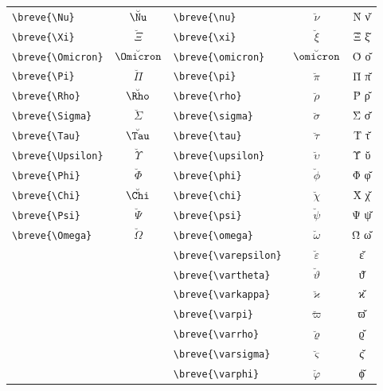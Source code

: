 \documentclass[12pt,a4paper]{article}
\begin{document}
\begin{longtable}{|l|c|l|c|c|}
\verb|\breve{\Nu}|         & $\breve{\Nu}$      & \verb|\breve{\nu}|         & $\breve{\nu}$         & Ν̆ ν̆ \\
\verb|\breve{\Xi}|         & $\breve{\Xi}$      & \verb|\breve{\xi}|         & $\breve{\xi}$         & Ξ̆ ξ̆ \\
\verb|\breve{\Omicron}|    & $\breve{\Omicron}$ & \verb|\breve{\omicron}|    & $\breve{\omicron}$    & Ο̆ ο̆ \\
\verb|\breve{\Pi}|         & $\breve{\Pi}$      & \verb|\breve{\pi}|         & $\breve{\pi}$         & Π̆ π̆ \\
\verb|\breve{\Rho}|        & $\breve{\Rho}$     & \verb|\breve{\rho}|        & $\breve{\rho}$        & Ρ̆ ρ̆ \\
\verb|\breve{\Sigma}|      & $\breve{\Sigma}$   & \verb|\breve{\sigma}|      & $\breve{\sigma}$      & Σ̆ σ̆ \\
\verb|\breve{\Tau}|        & $\breve{\Tau}$     & \verb|\breve{\tau}|        & $\breve{\tau}$        & Τ̆ τ̆ \\
\verb|\breve{\Upsilon}|    & $\breve{\Upsilon}$ & \verb|\breve{\upsilon}|    & $\breve{\upsilon}$    & Ῠ ῠ \\
\verb|\breve{\Phi}|        & $\breve{\Phi}$     & \verb|\breve{\phi}|        & $\breve{\phi}$        & Φ̆ φ̆ \\
\verb|\breve{\Chi}|        & $\breve{\Chi}$     & \verb|\breve{\chi}|        & $\breve{\chi}$        & Χ̆ χ̆ \\
\verb|\breve{\Psi}|        & $\breve{\Psi}$     & \verb|\breve{\psi}|        & $\breve{\psi}$        & Ψ̆ ψ̆ \\
\verb|\breve{\Omega}|      & $\breve{\Omega}$   & \verb|\breve{\omega}|      & $\breve{\omega}$      & Ω̆ ω̆ \\
                           &                    & \verb|\breve{\varepsilon}| & $\breve{\varepsilon}$ & ε̆ \\
                           &                    & \verb|\breve{\vartheta}|   & $\breve{\vartheta}$   & ϑ̆ \\
                           &                    & \verb|\breve{\varkappa}|   & $\breve{\varkappa}$   & ϰ̆ \\
                           &                    & \verb|\breve{\varpi}|      & $\breve{\varpi}$      & ϖ̆ \\
                           &                    & \verb|\breve{\varrho}|     & $\breve{\varrho}$     & ϱ̆ \\
                           &                    & \verb|\breve{\varsigma}|   & $\breve{\varsigma}$   & ς̆ \\
                           &                    & \verb|\breve{\varphi}|     & $\breve{\varphi}$     & ϕ̆ \\
\hline
\end{longtable}
\end{document}

